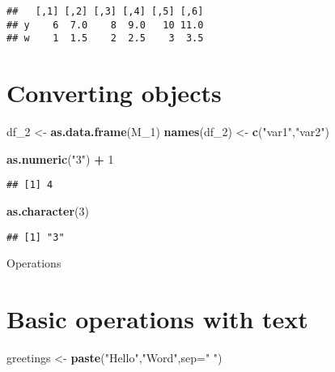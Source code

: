 \documentclass[]{article}
\newenvironment{Shaded}{\begin{snugshade}}{\end{snugshade}}
\newcommand{\KeywordTok}[1]{\textcolor[rgb]{0.13,0.29,0.53}{\textbf{#1}}}
\newcommand{\DataTypeTok}[1]{\textcolor[rgb]{0.13,0.29,0.53}{#1}}
\newcommand{\DecValTok}[1]{\textcolor[rgb]{0.00,0.00,0.81}{#1}}
\newcommand{\StringTok}[1]{\textcolor[rgb]{0.31,0.60,0.02}{#1}}
\newcommand{\OperatorTok}[1]{\textcolor[rgb]{0.81,0.36,0.00}{\textbf{#1}}}
\newcommand{\NormalTok}[1]{#1}
\begin{document}
\begin{verbatim}
##   [,1] [,2] [,3] [,4] [,5] [,6]
## y    6  7.0    8  9.0   10 11.0
## w    1  1.5    2  2.5    3  3.5
\end{verbatim}

\section{Converting objects}\label{converting-objects}

\begin{Shaded}
\begin{Highlighting}[]
\NormalTok{df_}\DecValTok{2}\NormalTok{ <-}\StringTok{ }\KeywordTok{as.data.frame}\NormalTok{(M_}\DecValTok{1}\NormalTok{)}
\KeywordTok{names}\NormalTok{(df_}\DecValTok{2}\NormalTok{) <-}\StringTok{ }\KeywordTok{c}\NormalTok{(}\StringTok{"var1"}\NormalTok{,}\StringTok{"var2"}\NormalTok{)}

\KeywordTok{as.numeric}\NormalTok{(}\StringTok{"3"}\NormalTok{) }\OperatorTok{+}\StringTok{ }\DecValTok{1}
\end{Highlighting}
\end{Shaded}

\begin{verbatim}
## [1] 4
\end{verbatim}

\begin{Shaded}
\begin{Highlighting}[]
\KeywordTok{as.character}\NormalTok{(}\DecValTok{3}\NormalTok{)}
\end{Highlighting}
\end{Shaded}

\begin{verbatim}
## [1] "3"
\end{verbatim}

Operations

\section{Basic operations with text}\label{basic-operations-with-text}

\begin{Shaded}
\begin{Highlighting}[]
\NormalTok{greetings <-}\StringTok{ }\KeywordTok{paste}\NormalTok{(}\StringTok{"Hello"}\NormalTok{,}\StringTok{"Word"}\NormalTok{,}\DataTypeTok{sep=}\StringTok{" "}\NormalTok{)}
\end{Highlighting}
\end{Shaded}
\end{document}
